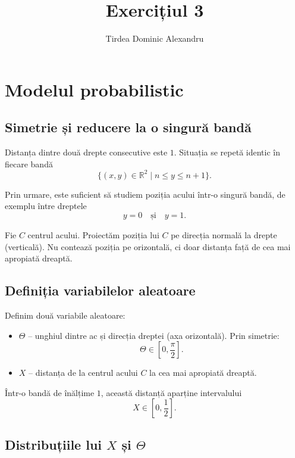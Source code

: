 \documentclass[12pt]{article}
\title{Exercițiul 3}
\author{Tirdea Dominic Alexandru}
\begin{document}
\maketitle

\par

\section{Modelul probabilistic}

\subsection{Simetrie și reducere la o singură bandă}

Distanța dintre două drepte consecutive este $1$. Situația se repetă identic în fiecare bandă
\[
\{(x,y)\in\mathbb{R}^2 \mid n \le y \le n+1\}.
\]

Prin urmare, este suficient să studiem poziția acului într-o singură bandă, de exemplu între dreptele
\[
y=0 \quad \text{și} \quad y=1.
\]

Fie $C$ centrul acului. Proiectăm poziția lui $C$ pe direcția normală la drepte (verticală). Nu contează poziția pe orizontală, ci doar distanța față de cea mai apropiată dreaptă.

\subsection{Definiția variabilelor aleatoare}

Definim două variabile aleatoare:

\begin{itemize}
  \item $\Theta$ – unghiul dintre ac și direcția dreptei (axa orizontală). Prin simetrie:
  \[
  \Theta \in \left[0,\frac{\pi}{2}\right].
  \]

  \item $X$ – distanța de la centrul acului $C$ la cea mai apropiată dreaptă.
\end{itemize}

Într-o bandă de înălțime $1$, această distanță aparține intervalului
\[
X \in \left[0,\frac{1}{2}\right].
\]

\subsection{Distribuțiile lui $X$ și $\Theta$}
\end{document}
